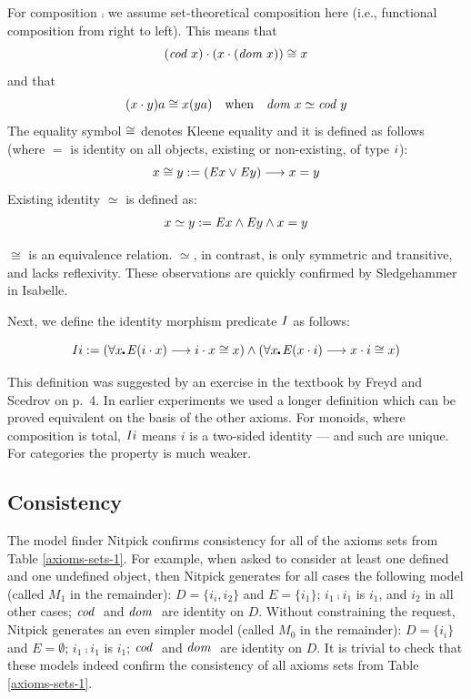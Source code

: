 For composition $\comp$ we assume set-theoretical composition here (i.e., functional 
composition from right to left). This means that
\[(\textit{cod \/} x) \cdot (x \cdot (\textit{dom \/} x)) \cong x\] 
and that 
\[(x \cdot y)a \cong x(y a) \quad \text{when}\quad
\textit{dom \/} x \simeq \textit{cod \/} y\] 
The equality symbol $\cong$ denotes Kleene equality and it
is defined as follows (where $=$ is identity on all objects, existing or non-existing, 
of type $i$):
\[x \cong y := (\mathit{E} x \vee \mathit{E} y) \longrightarrow x = y\]
Existing identity $\simeq$ is defined as:
\[x \simeq y := \mathit{E} x \wedge \mathit{E} y \wedge  x = y\]

$\cong$ is an equivalence relation. $\simeq$, in contrast, is only symmetric and transitive, and lacks 
reflexivity. These observations are quickly confirmed by Sledgehammer
in Isabelle.


Next, we define the identity morphism predicate $\textit{I\/}$ as follows: 

\[\id i \ddef (\forall x\lambdot \ex(i \comp x) \imp i \comp
x \cong x) \wedge (\forall x\lambdot \ex(x \comp i) \imp x \comp i \cong x)\]

This definition was suggested by an exercise in the textbook by Freyd
and Scedrov \cite{FreydScedrov90}
on p.~4.  In earlier experiments we used a longer definition which can
be proved equivalent on the basis of the other axioms. For monoids,
where composition is total, $\textit{I\/} i$ means $i$ is a two-sided identity
--- and such are unique. For categories the property is much weaker.
 

\subsection{Consistency}
The model finder Nitpick confirms consistency for all of the axioms
sets from Table \ref{axioms-sets-1}. For example, when asked to consider at least one defined and one undefined object, then
Nitpick generates for all cases the following model (called $M_1$ in the remainder):
$D=\{i_i,i_2\}$ and $E=\{i_1\}$;  $i_1\comp i_1$ is $i_1$,  and $i_2$
in all other cases; $\textit{cod \/}$ and $\textit{dom \/}$ are identity on $D$. Without constraining the request, Nitpick
generates an even simpler model (called $M_0$ in the remainder):
$D=\{i_i\}$ and $E=\emptyset$; $i_1\comp i_1$ is $i_1$; $\textit{cod \/}$ and
$\textit{dom \/}$ are identity on $D$. It is trivial to check that these models
indeed confirm the consistency of all axioms sets from Table \ref{axioms-sets-1}.



